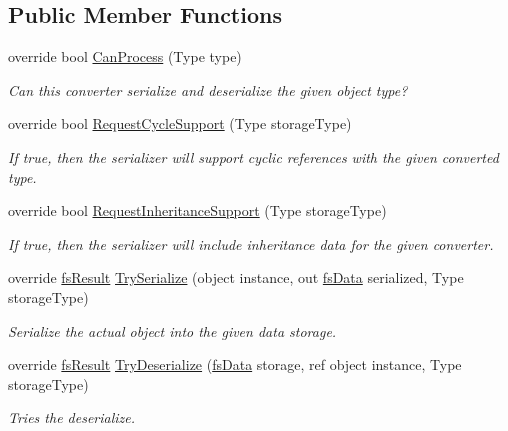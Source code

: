 \subsection*{Public Member Functions}
\begin{DoxyCompactItemize}
\item 
override bool \hyperlink{class_full_serializer_1_1_internal_1_1fs_primitive_converter_a07017626af98ba7a48a3947b7d49a08c}{Can\+Process} (Type type)
\begin{DoxyCompactList}\small\item\em Can this converter serialize and deserialize the given object type? \end{DoxyCompactList}\item 
override bool \hyperlink{class_full_serializer_1_1_internal_1_1fs_primitive_converter_a69a650703493e76171dff70be6ebec7c}{Request\+Cycle\+Support} (Type storage\+Type)
\begin{DoxyCompactList}\small\item\em If true, then the serializer will support cyclic references with the given converted type. \end{DoxyCompactList}\item 
override bool \hyperlink{class_full_serializer_1_1_internal_1_1fs_primitive_converter_a96bfa5776105d8d9fffb1fd01c53af2e}{Request\+Inheritance\+Support} (Type storage\+Type)
\begin{DoxyCompactList}\small\item\em If true, then the serializer will include inheritance data for the given converter. \end{DoxyCompactList}\item 
override \hyperlink{struct_full_serializer_1_1fs_result}{fs\+Result} \hyperlink{class_full_serializer_1_1_internal_1_1fs_primitive_converter_a6415a8256e0ab38b10e938c7aab8fcea}{Try\+Serialize} (object instance, out \hyperlink{class_full_serializer_1_1fs_data}{fs\+Data} serialized, Type storage\+Type)
\begin{DoxyCompactList}\small\item\em Serialize the actual object into the given data storage. \end{DoxyCompactList}\item 
override \hyperlink{struct_full_serializer_1_1fs_result}{fs\+Result} \hyperlink{class_full_serializer_1_1_internal_1_1fs_primitive_converter_a5143547d92eb9578d027c0a676ad0613}{Try\+Deserialize} (\hyperlink{class_full_serializer_1_1fs_data}{fs\+Data} storage, ref object instance, Type storage\+Type)
\begin{DoxyCompactList}\small\item\em Tries the deserialize. \end{DoxyCompactList}\end{DoxyCompactItemize}
